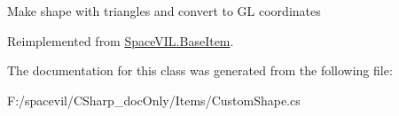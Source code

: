 Make shape with triangles and convert to GL coordinates 



Reimplemented from \mbox{\hyperlink{class_space_v_i_l_1_1_base_item_ac111d3d8cef36f406aa11862cefab9e2}{Space\+V\+I\+L.\+Base\+Item}}.



The documentation for this class was generated from the following file\+:\begin{DoxyCompactItemize}
\item 
F\+:/spacevil/\+C\+Sharp\+\_\+doc\+Only/\+Items/Custom\+Shape.\+cs\end{DoxyCompactItemize}
